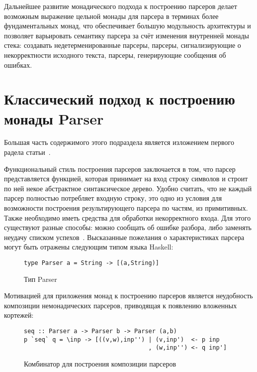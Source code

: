 Дальнейшее развитие монадического подхода к построению парсеров делает возможным
выражение цельной монады для парсера в терминах более фундаментальных монад, что
обеспечивает большую модульность архитектуры и позволяет варьировать семантику
парсера за счёт изменения внутренней монады стека: создавать недетерменированные
парсеры, парсеры, сигнализирующие о некорректности исходного текста, парсеры,
генерирующие сообщения об ошибках.

\section{Классический подход к построению монады Parser}

Большая часть содержимого этого подраздела является изложением первого радела
статьи~\autocite{MonParsing}.

Функциональный стиль построения парсеров заключается в том, что парсер
представляется функцией, которая принимает на вход строку символов и строит
по ней некое абстрактное синтаксическое дерево. Удобно считать, что не каждый 
парсер полностью потребляет входную строку, это одно из условия для возможности 
построения результирующего парсера по частям, из примитивных. Также необходимо 
иметь средства для обработки некорректного входа. Для этого существуют разные 
способы: можно сообщать об ошибке разбора, либо заменять неудачу списком 
успехов~\autocite{WadlerSuccess}. Высказанные пожелания о характеристиках 
парсера могут быть отражены следующим типом языка Haskell:

\begin{figure}[h]
\begin{lstlisting}
type Parser a = String -> [(a,String)]
\end{lstlisting}
\caption{Тип Parser}
\end{figure}

Мотивацией для приложения монад к построению парсеров является неудобность 
композиции немонадических парсеров, приводящая к появлению вложенных кортежей:

\begin{figure}[h]
\begin{lstlisting}
seq :: Parser a -> Parser b -> Parser (a,b)
p `seq` q = \inp -> [((v,w),inp'') | (v,inp')  <- p inp
                                   , (w,inp'') <- q inp']
\end{lstlisting}
\caption{Комбинатор для построения композиции парсеров}
\end{figure}

